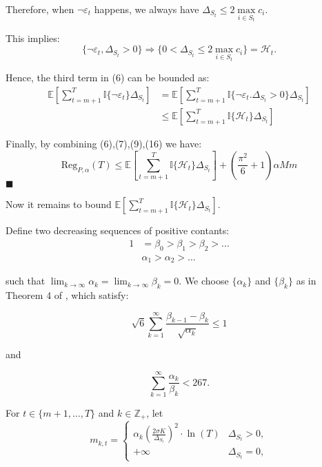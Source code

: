 \documentclass[opre,sglanonrev]{informs4}
\begin{document}
\begin{appendices}
Therefore, when $\lnot \varepsilon_t$ happens, we always have $\Delta_{S_t}\leq 2\mathop{\max}\limits_{i\in S_t}c_i$.

This implies:
$$
	\{\lnot \varepsilon_t, \Delta_{S_t}>0\}\Longrightarrow \{0<\Delta_{S_t}\leq 2\mathop{\max}\limits_{i\in S_t}c_i\}=\mathcal{H}_t.
$$

Hence, the third term in (6) can be bounded as:
\begin{equation}
	\begin{aligned}
		\mathbb{E}[\sum_{t=m+1}^{T}\mathbb{I}\{\lnot \varepsilon_t\}\Delta_{S_t}] &= \mathbb{E}[\sum_{t=m+1}^{T}\mathbb{I}\{\lnot \varepsilon_t. \Delta_{S_t}>0\}\Delta_{S_t}]\\
		&\leq \mathbb{E}[\sum_{t=m+1}^{T}\mathbb{I}\{\mathcal{H}_t\}\Delta_{S_t}]
	\end{aligned}
\end{equation}

Finally, by combining (6),(7),(9),(16) we have:
$$
	\text{Reg}_{P,\alpha}(T) \leq \mathbb{E}[\sum_{t=m+1}^{T}\mathbb{I}\{\mathcal{H}_t\}\Delta_{S_t}] + (\frac{\pi^2}{6}+1)\alpha M m
$$
\hfill $\blacksquare$

Now it remains to bound $\mathbb{E}[\sum_{t=m+1}^{T}\mathbb{I}\{\mathcal{H}_t\}\Delta_{S_t}]$.

Define two decreasing sequences of positive contants:
$$\begin{aligned}
1 & =\beta_0>\beta_1>\beta_2>\ldots \\
 & \alpha_1>\alpha_2>\ldots
\end{aligned}$$

such that $\lim_{k \to \infty}\alpha_k = \lim_{k \to \infty}\beta_k=0$. We choose $\{\alpha_k\}$ and $\{\beta_k\}$ as in Theorem 4 of \citep{Kveton2014TightRB}, which satisfy:

\begin{equation}\sqrt{6}\sum_{k=1}^\infty\frac{\beta_{k-1}-\beta_k}{\sqrt{\alpha_k}}\leq1\end{equation}

and

\begin{equation}\sum_{k=1}^\infty\frac{\alpha_k}{\beta_k}<267.\end{equation}

For $t \in \{m+1,...,T\}$ and $k \in \mathbb{Z}_+$, let
$$m_{k,t}=
\begin{cases}
\alpha_k\left(\frac{2\sigma K}{\Delta_{S_t}}\right)^2\cdot \ln(T) & \Delta_{S_t}>0, \\
+\infty & \Delta_{S_t}=0,
\end{cases}$$


\end{appendices}
\end{document}
